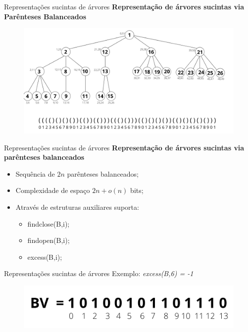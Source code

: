 \begin{frame}{Representações sucintas de árvores}
    \textbf{Representação de árvores sucintas via Parênteses Balanceados}
        \begin{figure}[h!]
            \centering
            
            \includegraphics[scale=0.37]{images/arvore_geral.png}
        \end{figure} 
\end{frame}

\begin{frame}{Representações sucintas de árvores}
    \textbf{Representação de árvores sucintas via parênteses balanceados}
        \begin{itemize}
            \item Sequência de $2n$ parênteses balanceados;
            \item Complexidade de espaço $2n + o(n)$ bits;
            \item Através de estruturas auxiliares suporta:
            \begin{itemize}
                \item findclose(B,i);
                \item findopen(B,i);
                \item excess(B,i);
            \end{itemize}
        \end{itemize}
    \end{frame}
    
    \begin{frame}{Representações sucintas de árvores}
    Exemplo: \textit{excess(B,6) = -1}
        \begin{figure}[h!]
            \centering
            
            \includegraphics[scale=0.5]{images/bitvector.png}
        \end{figure} 
\end{frame}